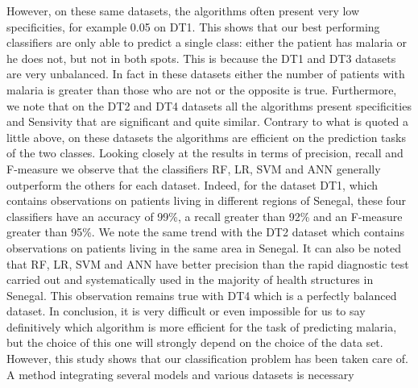 However, on these same datasets, the algorithms often present very low specificities, for example 0.05 on DT1. This shows that our best performing classifiers are only able to predict a single class: either the patient has malaria or he does not, but not in both spots. This is because the DT1 and DT3 datasets are very unbalanced. In fact in these datasets either the number of patients with malaria is greater than those who are not or the opposite is true. Furthermore, we note that on the DT2 and DT4 datasets all the algorithms present specificities and Sensivity that are significant and quite similar. Contrary to what is quoted a little above, on these datasets the algorithms are efficient on the prediction tasks of the two classes. Looking closely at the results in terms of precision, recall and F-measure we observe that the classifiers RF, LR, SVM and ANN generally outperform the others for each dataset. Indeed, for the dataset DT1, which contains observations on patients living in different regions of Senegal, these four classifiers have an accuracy of 99\%, a recall greater than 92\% and an F-measure greater than 95\%. We note the same trend with the DT2 dataset which contains observations on patients living in the same area in Senegal. It can also be noted that RF, LR, SVM and ANN have better precision than the rapid diagnostic test carried out and systematically used in the majority of health structures in Senegal. This observation remains true with DT4 which is a perfectly balanced dataset. In conclusion, it is very difficult or even impossible for us to say definitively which algorithm is more efficient for the task of predicting malaria, but the choice of this one will strongly depend on the choice of the data set. However, this study shows that our classification problem has been taken care of. A method integrating several models and various datasets is necessary

\begin{figure}[!h]

\end{figure}

